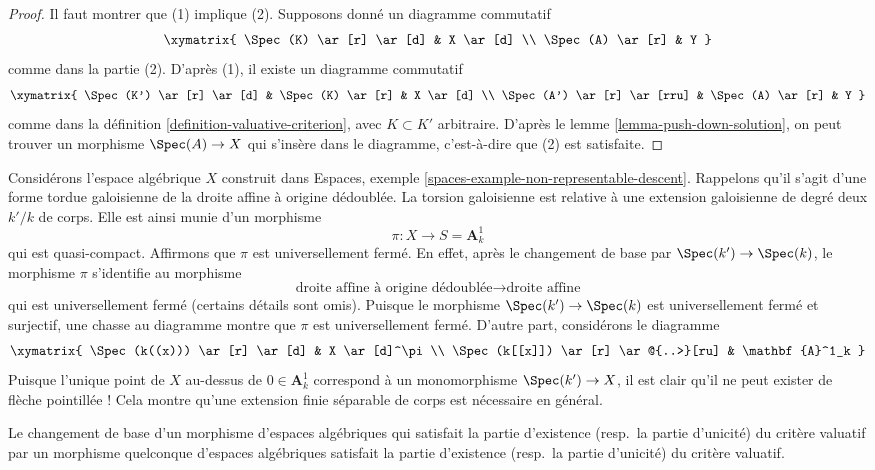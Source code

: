 \begin{proof}
Il faut montrer que (1) implique (2). Supposons donné un diagramme commutatif
$$
\xymatrix{
\Spec(K) \ar[r] \ar[d] & X \ar[d] \\
\Spec(A) \ar[r] & Y
}
$$
comme dans la partie (2). D'après (1), il existe un diagramme commutatif
$$
\xymatrix{
\Spec(K') \ar[r] \ar[d] & \Spec(K) \ar[r] & X \ar[d] \\
\Spec(A') \ar[r] \ar[rru] & \Spec(A) \ar[r] & Y
}
$$
comme dans la définition \ref{definition-valuative-criterion}, avec $K \subset K'$
arbitraire. D'après le lemme \ref{lemma-push-down-solution}, on peut trouver un morphisme
$\Spec(A) \to X$ qui s'insère dans le diagramme, c'est-à-dire que (2) est satisfaite.
\end{proof}

\begin{example}
\label{example-finite-separable-needed}
Considérons l'espace algébrique $X$ construit dans
Espaces, exemple \ref{spaces-example-non-representable-descent}.
Rappelons qu'il s'agit d'une forme tordue galoisienne de la droite affine à origine dédoublée.
La torsion galoisienne est relative à une extension galoisienne de degré deux
$k'/k$ de corps. Elle est ainsi munie d'un morphisme
$$
\pi : X \longrightarrow S = \mathbf{A}^1_k
$$
qui est quasi-compact. Affirmons que $\pi$ est universellement fermé.
En effet, après le changement de base par $\Spec(k') \to \Spec(k)$,
le morphisme $\pi$ s'identifie au morphisme
$$
\text{droite affine à origine dédoublée}
\longrightarrow
\text{droite affine}
$$
qui est universellement fermé (certains détails sont omis). Puisque le morphisme
$\Spec(k') \to \Spec(k)$ est universellement fermé et
surjectif, une chasse au diagramme montre que $\pi$ est universellement fermé.
D'autre part, considérons le diagramme
$$
\xymatrix{
\Spec(k((x))) \ar[r] \ar[d] & X \ar[d]^\pi \\
\Spec(k[[x]]) \ar[r] \ar@{..>}[ru] & \mathbf{A}^1_k
}
$$
Puisque l'unique point de $X$ au-dessus de $0 \in \mathbf{A}^1_k$
correspond à un monomorphisme $\Spec(k') \to X$,
il est clair qu'il ne peut exister de flèche pointillée ! Cela montre qu'une
extension finie séparable de corps est nécessaire en général.
\end{example}

\begin{lemma}
\label{lemma-base-change-valuative-criteria}
Le changement de base d'un morphisme d'espaces algébriques qui satisfait la
partie d'existence (resp.\ la partie d'unicité) du critère valuatif
par un morphisme quelconque d'espaces algébriques satisfait la
partie d'existence (resp.\ la partie d'unicité) du critère valuatif.
\end{lemma}

